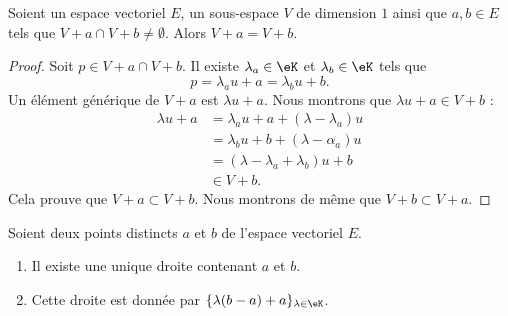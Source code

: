 \begin{lemma}	\label{LEMooLIASooAvjTvt}
	Soient un espace vectoriel \( E\), un sous-espace \( V\) de dimension \( 1\) ainsi que \( a,b\in E\) tels que \( V+a\cap V+b\neq \emptyset\). Alors \( V+a=V+b\).
\end{lemma}

\begin{proof}
	Soit \( p\in V+a\cap V+b\). Il existe \( \lambda_a\in \eK\) et \( \lambda_b\in \eK\) tels que
	\begin{equation}
		p=\lambda_a u+a=\lambda_b u+b.
	\end{equation}
	Un élément générique de \( V+a\) est \( \lambda u+a\). Nous montrons que \( \lambda u+a\in V+b\) :
	\begin{subequations}
		\begin{align}
			\lambda u+a & =\lambda_a u+a+(\lambda-\lambda_a)u \\
			            & =\lambda_b u+b+(\lambda-\alpha_a)u  \\
			            & =(\lambda-\lambda_a+\lambda_b)u+b   \\
			            & \in V+b.
		\end{align}
	\end{subequations}
	Cela prouve que \( V+a\subset V+b\). Nous montrons de même que \( V+b\subset V+a\).
\end{proof}


\begin{proposition}     \label{PROPooRSKLooVrxrFz}
	Soient deux points distincts \( a\) et \( b\) de l'espace vectoriel \( E\).
	\begin{enumerate}
		\item		\label{ITEMooQSJMooKUBHwf}
		      Il existe une unique droite contenant \( a\) et \( b\).
		\item		\label{ITEMooEOJNooSMCXtA}
		      Cette droite est donnée par \( \{ \lambda (b-a)+a \}_{\lambda\in \eK}\).
	\end{enumerate}
\end{proposition}

